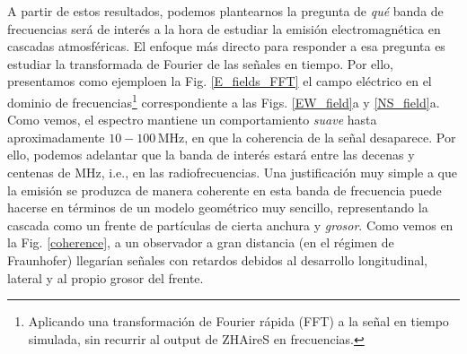 \documentclass[12 pt, a4paper]{article} %
\numberwithin{equation}{section}
\numberwithin{figure}{section}
\numberwithin{table}{section}
\begin{document}
A partir de estos resultados, podemos plantearnos la pregunta de \textit{qué} banda de frecuencias será de interés a la hora de estudiar la emisión electromagnética en cascadas atmosféricas. El enfoque más directo para responder a esa pregunta es estudiar la transformada de Fourier de las señales en tiempo. Por ello, presentamos como ejemploen la Fig. \ref{E_fields_FFT} el campo eléctrico en el dominio de frecuencias\footnote{ Aplicando una transformación de Fourier rápida (FFT) a la señal en tiempo simulada, sin recurrir al output de ZHAireS en frecuencias.} correspondiente a las Figs. \ref{EW_field}a y \ref{NS_field}a. Como vemos, el espectro mantiene un comportamiento \textit{suave} hasta aproximadamente $10-100\,\mathrm{MHz}$, en que la coherencia de la señal desaparece. Por ello, podemos adelantar que la banda de interés estará entre las decenas y centenas de $\mathrm{MHz}$, i.e., en las radiofrecuencias. Una justificación muy simple a que la emisión se produzca de manera coherente en esta banda de frecuencia puede hacerse en términos de un modelo geométrico muy sencillo, representando la cascada como un frente de partículas de cierta anchura y \textit{grosor}. Como vemos en la Fig. \ref{coherence}, a un observador a gran distancia (en el régimen de Fraunhofer) llegarían señales con retardos debidos al desarrollo longitudinal, lateral y al propio grosor del frente.
\end{document}
